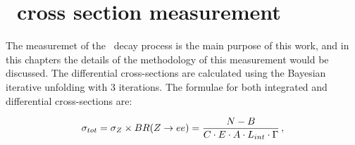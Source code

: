 \chapter{\Zee\ cross section measurement}
\label{sec:ZeeCrossSec}

The measuremet of the \Zee\ decay process is the main purpose of this work, and in this chapters the details of the methodology of this measurement would be discussed. The differential cross-sections are calculated using the Bayesian iterative unfolding with 3 iterations. The formulae for both integrated and differential cross-sections are:

\begin{equation}
\sigma_{tot} = \sigma_{Z} \times BR(Z \rightarrow ee) = \frac{N - B}{C \cdot E \cdot A \cdot L_{int}  \cdot \Gamma}\,,
\end{equation}

